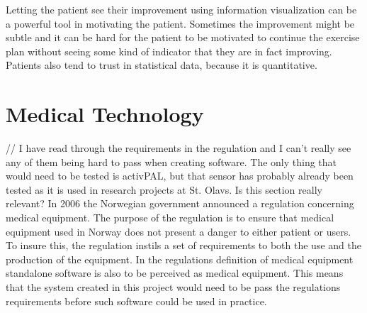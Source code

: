 Letting the patient see their improvement using information visualization can be a powerful tool in motivating the patient. Sometimes the improvement might be subtle and it can be hard for the patient to be motivated to continue the exercise plan without seeing some kind of indicator that they are in fact improving. Patients also tend to trust in statistical data, because it is quantitative. 

\section{Medical Technology}
// I have read through the requirements in the regulation and I can't really see any of them being hard to pass when creating software. The only thing that would need to be tested is activPAL, but that sensor has probably already been tested as it is used in research projects at St. Olavs. Is this section really relevant?
In 2006 the Norwegian government announced a regulation concerning medical equipment. The purpose of the regulation is to ensure that medical equipment used in Norway does not present a danger to either patient or users. To insure this, the regulation instils a set of requirements to both the use and the production of the equipment. In the regulations definition of medical equipment standalone software is also to be perceived as medical equipment. This means that the system created in this project would need to be pass the regulations requirements before such software could be used in practice. 
